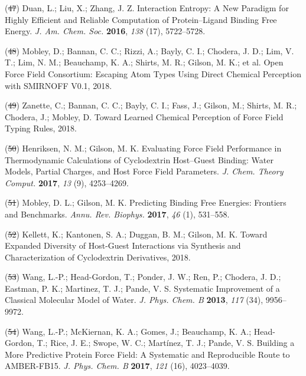 \documentclass[11pt,notitlepage]{article}
\providecommand{\DIFaddtex}[1]{{\protect\color{blue}\uwave{#1}}} %
\providecommand{\DIFdeltex}[1]{{\protect\color{red}\sout{#1}}}                      %
\providecommand{\DIFaddbegin}{} %
\providecommand{\DIFaddend}{} %
\providecommand{\DIFdelbegin}{} %
\providecommand{\DIFdelend}{} %
\providecommand{\DIFadd}[1]{\texorpdfstring{\DIFaddtex{#1}}{#1}} %
\providecommand{\DIFdel}[1]{\texorpdfstring{\DIFdeltex{#1}}{}} %
\newcommand{\DIFscaledelfig}{0.5}
\newlength{\DIFdelgraphicswidth} %
\newlength{\DIFdelgraphicsheight} %
\newcommand{\DIFaddincludegraphics}[2][]{{\color{blue}\fbox{\DIFOincludegraphics[#1]{#2}}}} %
\newcommand{\DIFdelincludegraphics}[2][]{%
\sbox{\DIFdelgraphicsbox}{\DIFOincludegraphics[#1]{#2}}%
\settoboxwidth{\DIFdelgraphicswidth}{\DIFdelgraphicsbox} %
\settoboxtotalheight{\DIFdelgraphicsheight}{\DIFdelgraphicsbox} %
\scalebox{\DIFscaledelfig}{%
\parbox[b]{\DIFdelgraphicswidth}{\usebox{\DIFdelgraphicsbox}\\[-\baselineskip] \rule{\DIFdelgraphicswidth}{0em}}\llap{\resizebox{\DIFdelgraphicswidth}{\DIFdelgraphicsheight}{%
\setlength{\unitlength}{\DIFdelgraphicswidth}%
\begin{picture}(1,1)%
\thicklines\linethickness{2pt} %
{\color[rgb]{1,0,0}\put(0,0){\framebox(1,1){}}}%
{\color[rgb]{1,0,0}\put(0,0){\line( 1,1){1}}}%
{\color[rgb]{1,0,0}\put(0,1){\line(1,-1){1}}}%
\end{picture}%
}\hspace*{3pt}}} %
} %
\DeclareRobustCommand{\DIFaddbegin}{\DIFOaddbegin \let\includegraphics\DIFaddincludegraphics} %
\DeclareRobustCommand{\DIFaddend}{\DIFOaddend \let\includegraphics\DIFOincludegraphics} %
\DeclareRobustCommand{\DIFdelbegin}{\DIFOdelbegin \let\includegraphics\DIFdelincludegraphics} %
\DeclareRobustCommand{\DIFdelend}{\DIFOaddend \let\includegraphics\DIFOincludegraphics} %
\begin{document}
\leavevmode\hypertarget{ref-gRfhPG7N}{}%
(\DIFdelbegin \DIFdel{47}\DIFdelend \DIFaddbegin \DIFadd{55}\DIFaddend ) Duan, L.; Liu, X.; Zhang, J. Z. Interaction Entropy: A New Paradigm
for Highly Efficient and Reliable Computation of Protein--Ligand Binding
Free Energy. \emph{J. Am. Chem. Soc.} \textbf{2016}, \emph{138} (17),
5722--5728.

\leavevmode\hypertarget{ref-HlBr7NrU}{}%
(\DIFdelbegin \DIFdel{48}\DIFdelend \DIFaddbegin \DIFadd{56}\DIFaddend ) Mobley, D.; Bannan, C. C.; Rizzi, A.; Bayly, C. I.; Chodera, J. D.;
Lim, V. T.; Lim, N. M.; Beauchamp, K. A.; Shirts, M. R.; Gilson, M. K.;
et al. Open Force Field Consortium: Escaping Atom Types Using Direct
Chemical Perception with SMIRNOFF V0.1, 2018.

\leavevmode\hypertarget{ref-13lTSBgHy}{}%
(\DIFdelbegin \DIFdel{49}\DIFdelend \DIFaddbegin \DIFadd{57}\DIFaddend ) Zanette, C.; Bannan, C. C.; Bayly, C. I.; Fass, J.; Gilson, M.;
Shirts, M. R.; Chodera, J.; Mobley, D. Toward Learned Chemical
Perception of Force Field Typing Rules, 2018.

\leavevmode\hypertarget{ref-HVgz5rZq}{}%
(\DIFdelbegin \DIFdel{50}\DIFdelend \DIFaddbegin \DIFadd{58}\DIFaddend ) Henriksen, N. M.; Gilson, M. K. Evaluating Force Field Performance
in Thermodynamic Calculations of Cyclodextrin Host--Guest Binding: Water
Models, Partial Charges, and Host Force Field Parameters. \emph{J. Chem.
Theory Comput.} \textbf{2017}, \emph{13} (9), 4253--4269.

\leavevmode\hypertarget{ref-12BD3oHp4}{}%
(\DIFdelbegin \DIFdel{51}\DIFdelend \DIFaddbegin \DIFadd{59}\DIFaddend ) Mobley, D. L.; Gilson, M. K. Predicting Binding Free Energies:
Frontiers and Benchmarks. \emph{Annu. Rev. Biophys.} \textbf{2017},
\emph{46} (1), 531--558.

\leavevmode\hypertarget{ref-13gqBX78S}{}%
(\DIFdelbegin \DIFdel{52}\DIFdelend \DIFaddbegin \DIFadd{60}\DIFaddend ) Kellett, K.; Kantonen, S. A.; Duggan, B. M.; Gilson, M. K. Toward
Expanded Diversity of Host-Guest Interactions via Synthesis and
Characterization of Cyclodextrin Derivatives, 2018.

\leavevmode\hypertarget{ref-50lAQZra}{}%
(\DIFdelbegin \DIFdel{53}\DIFdelend \DIFaddbegin \DIFadd{61}\DIFaddend ) Wang, L.-P.; Head-Gordon, T.; Ponder, J. W.; Ren, P.; Chodera, J.
D.; Eastman, P. K.; Martinez, T. J.; Pande, V. S. Systematic Improvement
of a Classical Molecular Model of Water. \emph{J. Phys. Chem. B}
\textbf{2013}, \emph{117} (34), 9956--9972.

\leavevmode\hypertarget{ref-1E3wArY0j}{}%
(\DIFdelbegin \DIFdel{54}\DIFdelend \DIFaddbegin \DIFadd{62}\DIFaddend ) Wang, L.-P.; McKiernan, K. A.; Gomes, J.; Beauchamp, K. A.;
Head-Gordon, T.; Rice, J. E.; Swope, W. C.; Martínez, T. J.; Pande, V.
S. Building a More Predictive Protein Force Field: A Systematic and
Reproducible Route to AMBER-FB15. \emph{J. Phys. Chem. B} \textbf{2017},
\emph{121} (16), 4023--4039.
\end{document}
